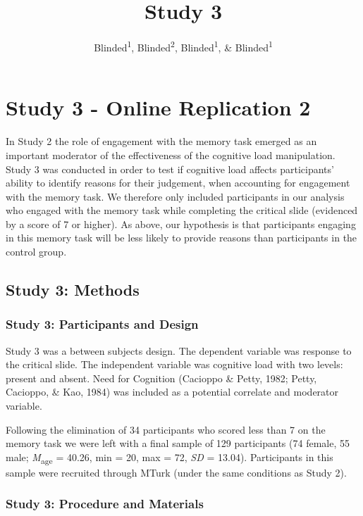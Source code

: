 \documentclass[
  american,
  man,floatsintext]{apa7}
\title{Study 3}
\author{Blinded\textsuperscript{1}, Blinded\textsuperscript{2}, Blinded\textsuperscript{1}, \& Blinded\textsuperscript{1}}
\date{}
\affiliation{\vspace{0.5cm}\textsuperscript{1} Blinded\\\textsuperscript{2} Blinded}
\begin{document}
\maketitle

\hypertarget{study-3---online-replication-2}{%
\section{Study 3 - Online Replication 2}\label{study-3---online-replication-2}}

In Study 2 the role of engagement with the memory task emerged as an important moderator of the effectiveness of the cognitive load manipulation. Study 3 was conducted in order to test if cognitive load affects participants' ability to identify reasons for their judgement, when accounting for engagement with the memory task. We therefore only included participants in our analysis who engaged with the memory task while completing the critical slide (evidenced by a score of 7 or higher). As above, our hypothesis is that participants engaging in this memory task will be less likely to provide reasons than participants in the control group.

\hypertarget{study-3-methods}{%
\subsection{Study 3: Methods}\label{study-3-methods}}

\hypertarget{study-3-participants-and-design}{%
\subsubsection{Study 3: Participants and Design}\label{study-3-participants-and-design}}

Study 3 was a between subjects design. The dependent variable was response to the critical slide. The independent variable was cognitive load with two levels: present and absent. Need for Cognition (Cacioppo \& Petty, 1982; Petty, Cacioppo, \& Kao, 1984) was included as a potential correlate and moderator variable.

Following the elimination of 34 participants who scored less than 7 on the memory task we were left with a final sample of 129 participants (74 female, 55 male; \emph{M}\textsubscript{age} = 40.26, min = 20, max = 72, \emph{SD} = 13.04). Participants in this sample were recruited through MTurk (under the same conditions as Study 2).

\hypertarget{study-3-procedure-and-materials}{%
\subsubsection{Study 3: Procedure and Materials}\label{study-3-procedure-and-materials}}
\end{document}
